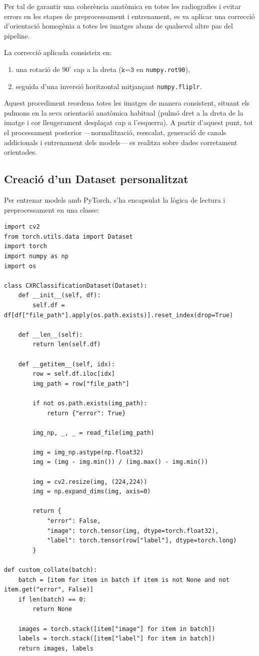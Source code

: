 \documentclass[12pt,a4paper]{article}
\begin{document}
Per tal de garantir una coherència anatòmica en totes les radiografies i evitar errors en les
etapes de preprocessament i entrenament, es va aplicar una correcció d’orientació homogènia
a totes les imatges abans de qualsevol altre pas del pipeline.

La correcció aplicada consisteix en:

\begin{enumerate}
    \item una rotació de \(90^\circ\) cap a la dreta (\(\texttt{k=3}\) en \texttt{numpy.rot90}),
    \item seguida d’una inversió horitzontal mitjançant \texttt{numpy.fliplr}.
\end{enumerate}

Aquest procediment reordena totes les imatges de manera consistent, situant els pulmons en
la seva orientació anatòmica habitual (pulmó dret a la dreta de la imatge i cor lleugerament
desplaçat cap a l’esquerra). A partir d’aquest punt, tot el processament posterior —normalització,
reescalat, generació de canals addicionals i entrenament dels models— es realitza sobre dades
corretament orientades.


\subsection{Creació d’un Dataset personalitzat}

Per entrenar models amb PyTorch, s’ha encapsulat la lògica de lectura i preprocessament en una classe:

\begin{lstlisting}[style=mypython]
import cv2
from torch.utils.data import Dataset
import torch
import numpy as np
import os

class CXRClassificationDataset(Dataset):
    def __init__(self, df):
        self.df = df[df["file_path"].apply(os.path.exists)].reset_index(drop=True)

    def __len__(self):
        return len(self.df)

    def __getitem__(self, idx):
        row = self.df.iloc[idx]
        img_path = row["file_path"]

        if not os.path.exists(img_path):
            return {"error": True}

        img_np, _, _ = read_file(img_path)

        img = img_np.astype(np.float32)
        img = (img - img.min()) / (img.max() - img.min())

        img = cv2.resize(img, (224,224))
        img = np.expand_dims(img, axis=0)

        return {
            "error": False,
            "image": torch.tensor(img, dtype=torch.float32),
            "label": torch.tensor(row["label"], dtype=torch.long)
        }

def custom_collate(batch):
    batch = [item for item in batch if item is not None and not item.get("error", False)]
    if len(batch) == 0:
        return None

    images = torch.stack([item["image"] for item in batch])
    labels = torch.stack([item["label"] for item in batch])
    return images, labels
\end{lstlisting}
\end{document}
